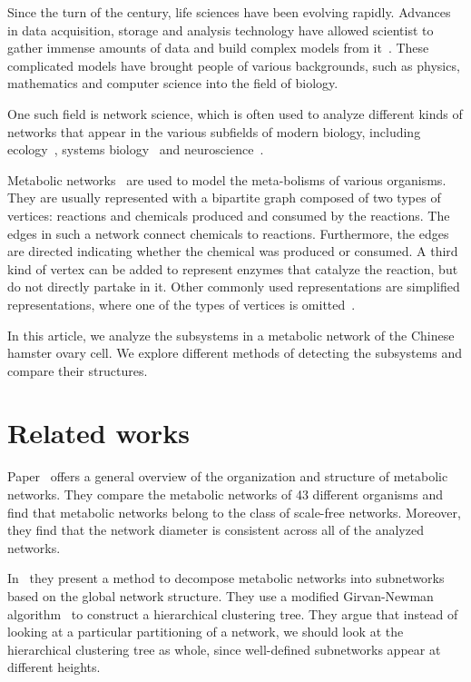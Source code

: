 Since the turn of the century, life sciences have been evolving
rapidly. Advances in data acquisition, storage and analysis technology have
allowed scientist to gather immense amounts of data and build complex models
from it~\cite{modsys}. These complicated models have brought people of various
backgrounds, such as physics, mathematics and computer science into the field
of biology.

One such field is network science, which
is often used to analyze different kinds of networks that appear in the various
subfields of modern biology, including ecology~\cite{proulx2005network}, systems
biology~\cite{barabasi2004network} and neuroscience~\cite{sporns2014contributions}.

Metabolic networks~\cite{jeong2000large} are used to model the meta-bolisms of
various organisms. They are usually represented with a bipartite graph composed
of two types of vertices: reactions and chemicals produced and consumed by the
reactions. The edges in such a network connect chemicals to
reactions. Furthermore, the edges are directed indicating whether the chemical
was produced or consumed. A third kind of vertex can be added to represent
enzymes that catalyze the reaction, but do not directly partake in
it. Other commonly used representations are simplified representations, where
one of the types of vertices is omitted~\cite{newman2010networks}.

In this article, we analyze the subsystems in a metabolic network of the
Chinese hamster ovary cell. We explore different methods of detecting the
subsystems and compare their structures.

\section{Related works}

Paper~\cite{jeong2000large} offers a general overview of the organization and structure of metabolic networks. 
They compare the metabolic networks of 43 different organisms and find that
metabolic networks belong to the class of scale-free networks. Moreover, they find that the network diameter is
consistent across all of the analyzed networks. 

In~\cite{holme2003subnetwork} they present a method to decompose metabolic networks into subnetworks based on the global network structure. They use a modified Girvan-Newman algorithm~\cite{girvan2002community} to construct a hierarchical clustering tree. They argue that instead of looking at a particular partitioning of a network, we should look at the hierarchical clustering tree as whole, since well-defined subnetworks appear at different heights.

